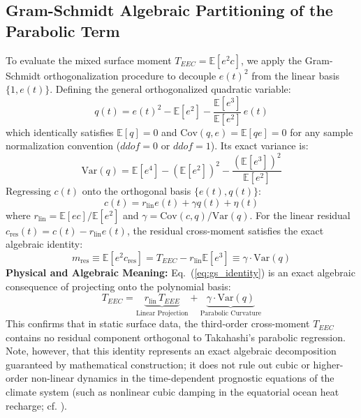 \documentclass[11pt,a4paper]{article}
\begin{document}
\subsection{Gram-Schmidt Algebraic Partitioning of the Parabolic Term}
To evaluate the mixed surface moment $T_{EEC} = \mathbb{E}[e^2 c]$, we apply the Gram-Schmidt orthogonalization procedure to decouple $e(t)^2$ from the linear basis $\{1, e(t)\}$. Defining the general orthogonalized quadratic variable:
\begin{equation}
q(t) = e(t)^2 - \mathbb{E}[e^2] - \frac{\mathbb{E}[e^3]}{\mathbb{E}[e^2]} \, e(t)
\label{eq:gs_q}
\end{equation}
which identically satisfies $\mathbb{E}[q] = 0$ and $\text{Cov}(q, e) = \mathbb{E}[q e] = 0$ for any sample normalization convention ($ddof = 0$ or $ddof = 1$). Its exact variance is:
\begin{equation}
\text{Var}(q) = \mathbb{E}[e^4] - (\mathbb{E}[e^2])^2 - \frac{(\mathbb{E}[e^3])^2}{\mathbb{E}[e^2]}
\end{equation}
Regressing $c(t)$ onto the orthogonal basis $\{e(t), q(t)\}$:
\begin{equation}
c(t) = r_{\text{lin}} e(t) + \gamma q(t) + \eta(t)
\end{equation}
where $r_{\text{lin}} = \mathbb{E}[e c] / \mathbb{E}[e^2]$ and $\gamma = \text{Cov}(c, q) / \text{Var}(q)$. For the linear residual $c_{\text{res}}(t) = c(t) - r_{\text{lin}} e(t)$, the residual cross-moment satisfies the exact algebraic identity:
\begin{equation}
m_{\text{res}} \equiv \mathbb{E}[e^2 c_{\text{res}}] = T_{EEC} - r_{\text{lin}} \mathbb{E}[e^3] \equiv \gamma \cdot \text{Var}(q)
\label{eq:gs_identity}
\end{equation}
\textbf{Physical and Algebraic Meaning:} Eq.~(\ref{eq:gs_identity}) is an exact algebraic consequence of projecting onto the polynomial basis:
\begin{equation}
T_{EEC} = \underbrace{r_{\text{lin}} \, T_{EEE}}_{\text{Linear Projection}} + \underbrace{\gamma \cdot \text{Var}(q)}_{\text{Parabolic Curvature}}
\end{equation}
This confirms that in static surface data, the third-order cross-moment $T_{EEC}$ contains no residual component orthogonal to Takahashi's parabolic regression. Note, however, that this identity represents an exact algebraic decomposition guaranteed by mathematical construction; it does not rule out cubic or higher-order non-linear dynamics in the time-dependent prognostic equations of the climate system (such as nonlinear cubic damping in the equatorial ocean heat recharge; cf. \citealt{han2026realistic}).
\end{document}

